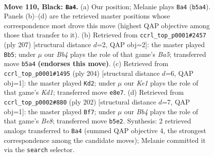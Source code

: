 \documentclass[11pt]{article}
\begin{document}
\clearpage

\begin{figure}[p]\centering
\begin{subfigure}{0.46\textwidth}\centering
\resizebox{\linewidth}{!}{%
\newchessgame
\chessboard[
  setfen={4k2K/8/8/1b3p2/5P2/8/8/8 b - - 35 110},
  showmover=false,
  pgfstyle=straightmove, color=movearrow, markmove={b5-a4}
]}
\caption{}
\end{subfigure}\hfill
\begin{subfigure}{0.46\textwidth}\centering
\resizebox{\linewidth}{!}{%
\newchessgame
\chessboard[
  setfen={4k3/8/p7/P7/b7/8/3K3B/8 b - - 15 104},
  showmover=false,
  pgfstyle=straightmove, color=movearrow, markmove={a4-b5}
]}
\caption{}
\end{subfigure}
\\[4pt]
\begin{subfigure}{0.46\textwidth}\centering
\resizebox{\linewidth}{!}{%
\newchessgame
\chessboard[
  setfen={4k3/8/8/4p3/8/5P2/B4b2/3K4 w - - 27 103},
  showmover=false,
  pgfstyle=straightmove, color=movearrow, markmove={d1-d2}
]}
\caption{}
\end{subfigure}\hfill
\begin{subfigure}{0.46\textwidth}\centering
\resizebox{\linewidth}{!}{%
\newchessgame
\chessboard[
  setfen={4B1n1/8/3p4/3P4/1k6/8/2K5/8 w - - 17 102},
  showmover=false,
  pgfstyle=straightmove, color=movearrow, markmove={e8-f7}
]}
\caption{}
\end{subfigure}
\caption{\textbf{Move 110, Black: \texttt{Ba4}.} (a) Our position; Melanie plays \texttt{Ba4} (\texttt{b5a4}). Panels (b)--(d) are the retrieved master positions whose correspondence most drove this move (highest QAP objective among those that transfer to it). (b) Retrieved from \texttt{ccrl\_top\_p0001\#2457} (ply 207) [structural distance $d$=2, QAP obj=2]: the master played \texttt{Bb5}; under $\mu$ our \emph{Bb4} plays the role of that game's \emph{Ba5}; transferred move \texttt{b5a4} \textbf{(endorses this move)}. (c) Retrieved from \texttt{ccrl\_top\_p0001\#1495} (ply 204) [structural distance $d$=6, QAP obj=1]: the master played \texttt{Kd2}; under $\mu$ our \emph{Ke1} plays the role of that game's \emph{Kd1}; transferred move \texttt{e8e7}. (d) Retrieved from \texttt{ccrl\_top\_p0002\#880} (ply 202) [structural distance $d$=7, QAP obj=1]: the master played \texttt{Bf7}; under $\mu$ our \emph{Bb4} plays the role of that game's \emph{Be8}; transferred move \texttt{b5e2}. Synthesis: 2 retrieved analogs transferred to \texttt{Ba4} (summed QAP objective 4, the strongest correspondence among the candidate moves); Melanie committed it via the \texttt{search} selector.}
\label{fig:thought-m219}
\end{figure}
\end{document}
